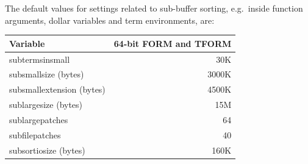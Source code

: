 The default values for settings related to sub-buffer sorting, e.g.~inside
function arguments, dollar variables and term environments, are:
\begin{center}
\begin{tabular}{lr}
Variable         &      64-bit FORM and TFORM  \\ \hline
subtermsinsmall &          30K        \\
subsmallsize (bytes)&      3000K      \\
subsmallextension (bytes)& 4500K      \\ \hline
sublargesize (bytes)&      15M        \\
sublargepatches &          64         \\
subfilepatches &           40         \\ \hline
subsortiosize (bytes)&     160K       \\
\end{tabular}
\end{center}

